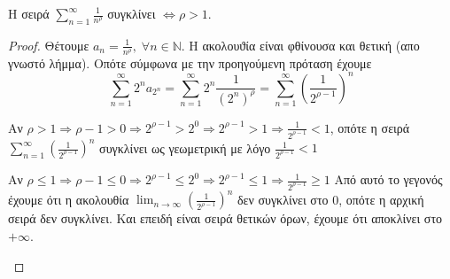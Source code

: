 \documentclass[main.tex]{subfiles}
\begin{document}
\begin{cor}
    Η σειρά $ \sum_{n=1}^{\infty} \frac{1}{n^{\rho}} $ συγκλίνει $ \Leftrightarrow 
    \rho > 1$.
\end{cor}
\begin{proof}
\item {}
    Θέτουμε $ a_{n}= \frac{1}{n^{\rho}}, \; \forall n \in \mathbb{N} $. Η 
    ακολουϑία είναι φθίνουσα και θετική (απο γνωστό λήμμα). Οπότε σύμφωνα 
    με την προηγούμενη πρόταση έχουμε
    \[
        \sum_{n=1}^{\infty} 2^{n} a_{2^{n}} = \sum_{n=1}^{\infty} 2 ^{n} 
        \frac{1}{(2^{n})^{\rho}} = \sum_{n=1}^{\infty} \left(\frac{1}{2^{\rho -1}} 
        \right)^{n}
     \] 
     \begin{myitemize}
     \item Αν $ \rho >1 \Rightarrow \rho -1 >0 \Rightarrow 2^{\rho -1} > 2^{0} 
         \Rightarrow 2^{\rho -1} > 1 \Rightarrow \frac{1}{2^{\rho -1}} < 1 $, οπότε
         η σειρά $ \sum_{n=1}^{\infty} \left(\frac{1}{2^{\rho -1}} \right)^{n} $ 
         συγκλίνει ως γεωμετρική με λόγο $ \frac{1}{2^{\rho -1}} < 1 $
     \item Αν $ \rho \leq 1 \Rightarrow \rho -1 \leq 0 \Rightarrow 2^{\rho -1} \leq 
         2^{0} \Rightarrow 2^{\rho -1} \leq 1 \Rightarrow \frac{1}{2^{\rho -1}} \geq 1 $
         Από αυτό το γεγονός έχουμε ότι η ακολουθία 
         $ \lim_{n \to \infty} \left(\frac{1}{2^{\rho -1}}\right)^{n} $ 
         δεν συγκλίνει στο 0, οπότε η αρχική σειρά δεν συγκλίνει. Και επειδή είναι 
         σειρά θετικών όρων, έχουμε ότι αποκλίνει στο $ + \infty $.
     \end{myitemize}
\end{proof}
\end{document}
